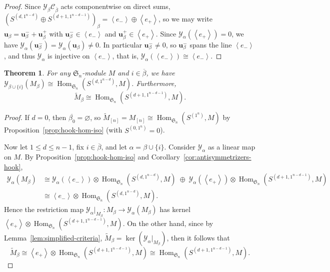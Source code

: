 \documentclass[11pt, noadjust, reqno]{amsart}
\newtheorem{theorem}{Theorem}[section]
\theoremstyle{definition}
\theoremstyle{remark}
\numberwithin{equation}{section}
\renewcommand{\emptyset}{\varnothing}
\newcommand{\0}{\emptyset}
\renewcommand{\S}{\mathfrak{S}}
\newcommand{\cC}{\mathcal{C}}
\newcommand{\cY}{\mathcal{Y}}
\DeclareMathOperator{\Hom}{Hom}
\begin{document}
\begin{proof}
Since $\cY_\beta \cC_{\overline{\beta}}$ acts componentwise on direct sums, $(S^{(d,1^{n-d})} \oplus S^{(d+1,1^{n-d-1})})_\beta = \left\langle e_-\right\rangle \oplus \left\langle e_+ \right\rangle$, so we may write $\bm{u}_\beta = \bm{u}_\beta^- + \bm{u}_\beta^+$ with $\bm{u}_\beta^- \in \left\langle e_- \right\rangle$ and $\bm{u}_\beta^+ \in \left\langle e_+ \right\rangle$.
Since $\cY_\alpha(\left\langle e_+ \right\rangle) = 0$, we have $\cY_\alpha(\bm{u}_\beta^-) = \cY_\alpha(\bm{u}_\beta) \neq 0$.
In particular $\bm{u}_\beta^- \neq 0$, so $\bm{u}_\beta^-$ spans the line $\left\langle e_- \right\rangle$, and thus $\cY_\alpha$ is injective on $\left\langle e_- \right\rangle$, that is, $\cY_\alpha(\left\langle e_- \right\rangle) \cong \left\langle e_- \right\rangle$.
\end{proof}

\begin{theorem}\label{thm:tildehook-hom-iso}
For any $\S_n$-module $M$ and $i \in \overline{\beta}$, we have $\cY_{\beta \cup \{i\}}(M_\beta) \cong \Hom_{\S_n}( S^{(d,1^{n-d})}, M)$. Furthermore,
    \[
\widetilde{M}_\beta \cong 
\Hom_{\S_n}( S^{(d+1,1^{n-d-1})}, M).
    \]
\end{theorem}
\begin{proof}

If $d = 0$, then $\overline{\beta_0} = \emptyset$, so $\widetilde{M}_{[n]} = M_{[n]} \cong \Hom_{\S_n}(S^{(1^n)}, M)$ by Proposition~\ref{prop:hook-hom-iso} (with $S^{(0,1^n)} = 0$). 

Now let $1 \leq d \leq n-1$, fix $i \in \overline{\beta}$, and let $\alpha = \beta \cup \{i\}$.
Consider $\cY_{\alpha}$ as a linear map on $M$.
By Proposition~\ref{prop:hook-hom-iso} and Corollary~\ref{cor:antisymmetrizers-hook}, 
\begin{align*}
\cY_{\alpha}(M_\beta) &\cong \cY_{\alpha}(\left\langle e_- \right\rangle ) \otimes \Hom_{\S_n}( S^{(d,1^{n-d})}, M) \; \oplus \; \cY_{\alpha}(\left\langle e_+ \right\rangle)   \otimes \Hom_{\S_n}( S^{(d+1,1^{n-d-1})}, M) \\
&\cong \left\langle e_- \right\rangle  \otimes \Hom_{\S_n}( S^{(d,1^{n-d})}, M). 
\end{align*}
Hence the restriction map $\cY_{\alpha}|_{M_\beta}: M_\beta \to \cY_{\alpha}(M_\beta)$ has kernel $\left\langle e_+ \right\rangle   \otimes \Hom_{\S_n}( S^{(d+1,1^{n-d-1})}, M) $. 
On the other hand, since by Lemma~\ref{lem:simplified-criteria}, $\widetilde{M}_\beta = \ker(\cY_{\alpha}|_{M_\beta})$, then it follows that
\[
\widetilde{M}_\beta \cong \left\langle e_+ \right\rangle   \otimes \Hom_{\S_n}( S^{(d+1,1^{n-d-1})}, M) \cong \Hom_{\S_n}( S^{(d+1,1^{n-d-1})}, M).
\]
\end{proof}
\end{document}
